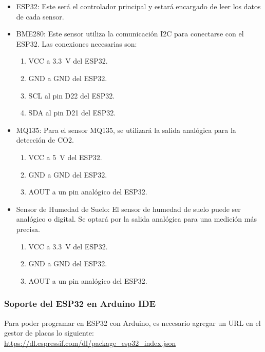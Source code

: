 \documentclass[../main]{subfiles}
\begin{document}
\begin{itemize}
	\item ESP32: Este será el controlador principal y estará encargado de leer los datos de cada sensor.
	\item BME280: Este sensor utiliza la comunicación I2C para conectarse con el ESP32. Las conexiones necesarias son:
	      \begin{enumerate}
		      \item VCC a \qty{3.3}{\V} del ESP32.
		      \item GND a GND del ESP32.
		      \item SCL al pin D22 del ESP32.
		      \item SDA al pin D21 del ESP32.
	      \end{enumerate}
	\item MQ135: Para el sensor MQ135, se utilizará la salida analógica para la detección de CO2.
	      \begin{enumerate}
		      \item VCC a \qty{5}{\V} del ESP32.
		      \item GND a GND del ESP32.
		      \item AOUT a un pin analógico del ESP32.
	      \end{enumerate}
	\item Sensor de Humedad de Suelo: El sensor de humedad de suelo puede ser analógico o digital. Se optará por la salida analógica para una medición más precisa.
	      \begin{enumerate}
		      \item VCC a \qty{3.3}{\V} del ESP32.
		      \item GND a GND del ESP32.
		      \item AOUT a un pin analógico del ESP32.
	      \end{enumerate}
\end{itemize}

\subsubsection{Soporte del ESP32 en Arduino IDE}

Para poder programar en ESP32 con Arduino, es necesario agregar un URL en el
gestor de placas lo siguiente:
\url{https://dl.espressif.com/dl/package_esp32_index.json}
\end{document}
